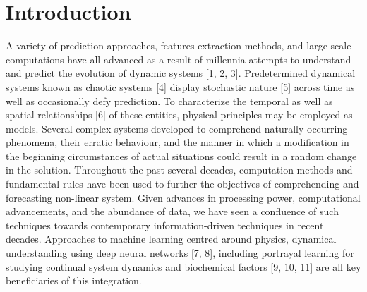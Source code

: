 \documentclass[conference]{IEEEtran}
\begin{document}
\section{Introduction}\label{sec1}
A variety of prediction approaches, features extraction methods, and large-scale computations have all advanced as a result of millennia attempts to understand and predict the evolution of dynamic systems [1, 2, 3]. Predetermined dynamical systems known as chaotic systems [4] display stochastic nature [5] across time as well as occasionally defy prediction. To characterize the temporal as well as spatial relationships [6] of these entities, physical principles may be employed as models. Several complex systems developed to comprehend naturally occurring phenomena, their erratic behaviour, and the manner in which a modification in the beginning circumstances of actual situations could result in a random change in the solution. Throughout the past several decades, computation methods and fundamental rules have been used to further the objectives of comprehending and forecasting non-linear system. Given advances in processing power, computational advancements, and the abundance of data, we have seen a confluence of such techniques towards contemporary information-driven techniques in recent decades. Approaches to machine learning centred around physics, dynamical understanding using deep neural networks [7, 8], including portrayal learning for studying continual system dynamics and biochemical factors [9, 10, 11] are all key beneficiaries of this integration.\\
\end{document}
